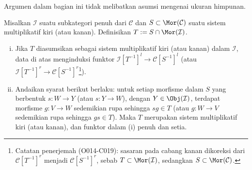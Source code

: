 Argumen dalam bagian ini tidak melibatkan asumsi mengenai ukuran himpunan.

\begin{proposisi}\label{prop:subcat-localization}
	Misalkan $\mathcal{I}$ suatu subkategori penuh dari $\mathcal{C}$ dan
	$S \subset \Mor(\mathcal{C})$ suatu sistem multiplikatif kiri (atau
	kanan). Definisikan $T := S \cap \Mor(\mathcal{I})$.
	\begin{enumerate}[(i)]
		\item Jika $T$ diasumsikan sebagai sistem multiplikatif kiri (atau
		kanan) dalam $\mathcal{I}$, data di atas menginduksi funktor
		$\mathcal{I}[T^{-1}]^l \to \mathcal{C}[S^{-1}]^l$ (atau
		$\mathcal{I}[T^{-1}]^r \to \mathcal{C}[S^{-1}]^r$\footnote{Catatan
		penerjemah (O014-C019): sasaran pada cabang kanan dikoreksi dari
		$\mathcal{C}[T^{-1}]^r$ menjadi $\mathcal{C}[S^{-1}]^r$, sebab
		$T \subset \Mor(\mathcal{I})$, sedangkan
		$S \subset \Mor(\mathcal{C})$.}).
		\item Andaikan syarat berikut berlaku: untuk setiap morfisme dalam $S$
		yang berbentuk $s: W \to Y$ (atau $s: Y \to W$), dengan
		$Y \in \Obj(\mathcal{I})$, terdapat morfisme $g: V \to W$ sedemikian
		rupa sehingga $sg \in T$ (atau $g: W \to V$ sedemikian rupa sehingga
		$gs \in T$). Maka $T$ merupakan sistem multiplikatif kiri (atau
		kanan), dan funktor dalam (i) penuh dan setia.
	\end{enumerate}
\end{proposisi}
